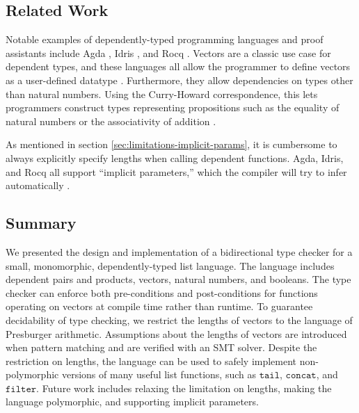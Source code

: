 \documentclass[acmsmall,nonacm]{acmart}
\begin{document}
\subsection{Related Work} \label{sec:related-work}


Notable examples of dependently-typed programming languages and proof assistants include Agda \cite{agda}, Idris \cite{idris}, and Rocq \cite{rocq}.
Vectors are a classic use case for dependent types, and these languages all allow the programmer to define vectors as a user-defined datatype \cite{agda-vec, idris-vec, rocq-vec}.
Furthermore, they allow dependencies on types other than natural numbers.
Using the Curry-Howard correspondence, this lets programmers construct types representing propositions such as the equality of natural numbers or the associativity of addition \cite{comp523-lec-agda}.


As mentioned in section \ref{sec:limitations-implicit-params}, it is cumbersome to always explicitly specify lengths when calling dependent functions.
Agda, Idris, and Rocq all support ``implicit parameters,'' which the compiler will try to infer automatically \cite{agda-implicit-params, idris-implicit-params, rocq-implicit-params}.

\subsection{Summary}
We presented the design and implementation of a bidirectional type checker for a small, monomorphic, dependently-typed list language.
The language includes dependent pairs and products, vectors, natural numbers, and booleans.
The type checker can enforce both pre-conditions and post-conditions for functions operating on vectors at compile time rather than runtime.
To guarantee decidability of type checking, we restrict the lengths of vectors to the language of Presburger arithmetic.
Assumptions about the lengths of vectors are introduced when pattern matching and are verified with an SMT solver.
Despite the restriction on lengths, the language can be used to safely implement non-polymorphic versions of many useful list functions, such as $\texttt{tail}$, $\texttt{concat}$, and $\texttt{filter}$.
Future work includes relaxing the limitation on lengths, making the language polymorphic, and supporting implicit parameters.

\newpage


\end{document}
